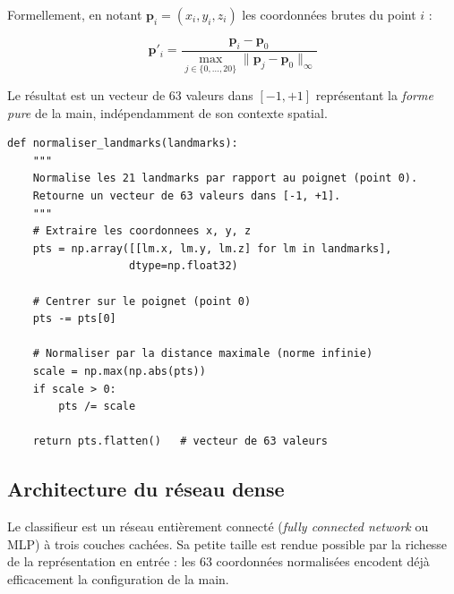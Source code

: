 \documentclass[12pt, a4paper]{article}
\begin{document}
Formellement, en notant \(\mathbf{p}_i = (x_i, y_i, z_i)\) les coordonnées brutes
du point \(i\) :

\begin{equation}
  \mathbf{p}'_i = \frac{\mathbf{p}_i - \mathbf{p}_0}
                       {\displaystyle\max_{j \in \{0,\ldots,20\}} \|\mathbf{p}_j - \mathbf{p}_0\|_\infty}
  \label{eq:normalisation}
\end{equation}

Le résultat est un vecteur de 63 valeurs dans \([-1, +1]\) représentant la
\emph{forme pure} de la main, indépendamment de son contexte spatial.

\begin{lstlisting}[caption={Fonction de normalisation des landmarks (extrait de
                   \texttt{3\_collecter\_landmarks.py} et \texttt{5\_jouer\_avec\_cnn.py})},
                   label=lst:normalisation]
def normaliser_landmarks(landmarks):
    """
    Normalise les 21 landmarks par rapport au poignet (point 0).
    Retourne un vecteur de 63 valeurs dans [-1, +1].
    """
    # Extraire les coordonnees x, y, z
    pts = np.array([[lm.x, lm.y, lm.z] for lm in landmarks],
                   dtype=np.float32)

    # Centrer sur le poignet (point 0)
    pts -= pts[0]

    # Normaliser par la distance maximale (norme infinie)
    scale = np.max(np.abs(pts))
    if scale > 0:
        pts /= scale

    return pts.flatten()   # vecteur de 63 valeurs
\end{lstlisting}

\subsection{Architecture du réseau dense}

Le classifieur est un réseau entièrement connecté (\emph{fully connected network}
ou MLP) à trois couches cachées. Sa petite taille est rendue possible par la
richesse de la représentation en entrée : les 63 coordonnées normalisées
encodent déjà efficacement la configuration de la main.
\end{document}
